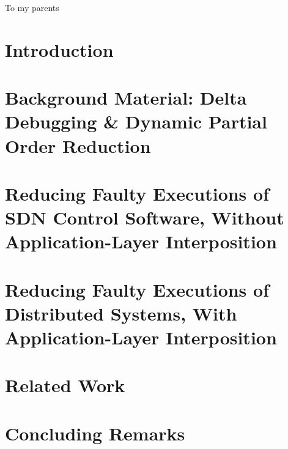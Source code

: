 

\begin{abstract}

\end{abstract}

\begin{frontmatter}

\begin{dedication}
\null\vfil
{\large
\begin{center}
To my parents
\end{center}}
\null\vfil
\end{dedication}

\tableofcontents
\listoffigures %
\listoftables %

\makeatletter
\let\@currsize\normalsize
\makeatother
{}
\setlength{\parskip}{.25\baselineskip}%

%

\end{frontmatter}

\makeatletter
\let\@currsize\normalsize
\makeatother
{}
\setlength{\parskip}{.25\baselineskip}%

\chapter{Introduction}
\label{sec:intro}


\chapter{Background Material: Delta Debugging \& Dynamic Partial Order
Reduction}
\label{sec:background_material}


\chapter{Reducing Faulty Executions of SDN Control Software, Without Application-Layer Interposition}
\label{sec:sts}


\chapter{Reducing Faulty Executions of Distributed Systems, With Application-Layer Interposition}
\label{sec:demi}


\chapter{Related Work}
\label{sec:related_work}


\chapter{Concluding Remarks}
\label{main_sec:conclusion}


%

%


\printbibliography


